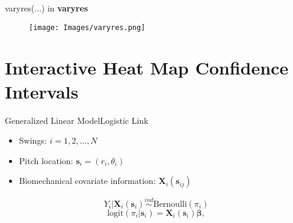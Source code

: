 \documentclass{beamer}
\begin{document}
% 
% 
% 
% 
% 
% 
% 
% 
\begin{frame}{varyres(...) in {\bf varyres}}
  \begin{figure}[H]
	\centering
	\texttt{[image: Images/varyres.png]}
	\end{figure}
	\end{frame}

\section{Interactive Heat Map Confidence Intervals}

\begin{frame}{Generalized Linear Model}{Logistic Link}
\begin{itemize}
  \addtolength{\itemsep}{0.5\baselineskip}
\item Swings: $i = 1,2,\ldots, N$
\item Pitch location: $\mathbf{s}_{i} = (r_{i},\theta_{i})$
\item Biomechanical covariate information: $\mathbf{X}_{i}(\mathbf{s}_{ij})$
\end{itemize}
$$Y_{i}|\mathbf{X}_{i}(\mathbf{s}_{i}) \stackrel{ind}{\sim} \mbox{Bernoulli}(\pi_{i}) $$
$$
\text{logit}(\pi_{i}|\pmb{s}_{i}) = \mathbf{X}_{i}(\mathbf{s}_{i})\pmb{\beta},
$$
\end{frame}
\end{document}
